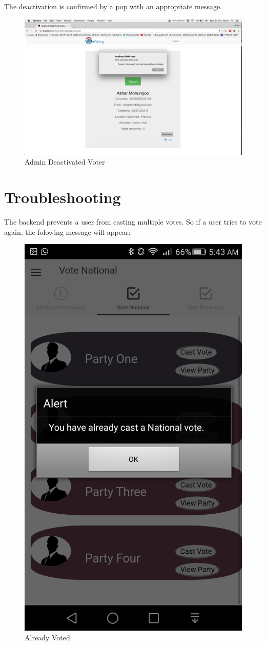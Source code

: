 \documentclass[11pt]{article}
\begin{document}
				 The deactivation is confirmed by a pop with an appropriate message. 
				 \begin{figure}[H]
				 	\centering
				 	\includegraphics[width=0.7\linewidth]{../Images/UserManual/adminWeb/admindeactivatedvoter.png}
				 	\caption{Admin Deactivated Voter}
				 \end{figure}
	\newpage
		\section{Troubleshooting}
		The backend prevents a user from casting multiple votes. So if a user tries to vote again, the folowing message will appear:
		\begin{figure}[H]
			\centering
			\includegraphics[width=0.3\linewidth]{../Images/UserManual/alreadyvoted.png}
			\caption{Already Voted}
			\label{alreadyVoted}
		\end{figure}
\end{document}
